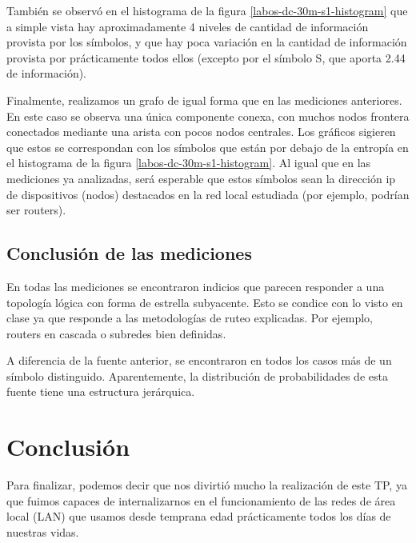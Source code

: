 \documentclass[final,inline,a4paper,narroweqnarray]{ieee}
\let\Oldsection\section
\renewcommand{\section}{\FloatBarrier\Oldsection}
\let\Oldsubsection\subsection
\renewcommand{\subsection}{\FloatBarrier\Oldsubsection}
\begin{document}
    También se observó en el histograma de la figura \ref{labos-dc-30m-s1-histogram} 
    que a simple vista hay aproximadamente 4 niveles de
    cantidad de información provista por los símbolos, y que hay poca
    variación en la cantidad de información provista por prácticamente todos
    ellos (excepto por el símbolo S, que aporta 2.44 de información).

    Finalmente, realizamos un grafo de igual forma que en las mediciones
    anteriores. En este caso se observa una única componente conexa, con
    muchos nodos frontera conectados mediante una arista con pocos nodos
    centrales. Los gráficos sigieren que estos se correspondan con los
    símbolos que están por debajo de la entropía en el histograma de la figura
    \ref{labos-dc-30m-s1-histogram}. Al igual que en las mediciones ya
    analizadas, será esperable que estos símbolos sean la dirección ip de
    dispositivos (nodos) destacados en la red local estudiada (por ejemplo,
    podrían ser routers).

  \subsection{Conclusión de las mediciones}

  En todas las mediciones se encontraron indicios que parecen responder a una
  topología lógica con forma de estrella subyacente. Esto se condice con lo
  visto en clase ya que responde a las metodologías de ruteo explicadas. Por
  ejemplo, routers en cascada o subredes bien definidas.

  A diferencia de la fuente anterior, se encontraron en todos los casos más de
  un símbolo distinguido. Aparentemente, la distribución de probabilidades de
  esta fuente tiene una estructura jerárquica.

\newpage
\section{Conclusión}

Para finalizar, podemos decir que nos divirtió mucho la realización de este
TP, ya que fuimos capaces de internalizarnos en el funcionamiento de las redes
de área local (LAN) que usamos desde temprana edad prácticamente todos los
días de nuestras vidas.
\end{document}
